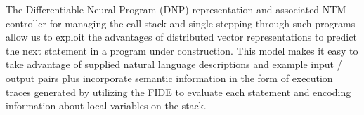 
The Differentiable Neural Program (DNP) representation and associated NTM controller for managing the call stack and single-stepping through such programs allow us to exploit the advantages of distributed vector representations to predict the next statement in a program under construction. This model makes it easy to take advantage of supplied natural language descriptions and example input / output pairs plus incorporate semantic information in the form of execution traces generated by utilizing the FIDE to evaluate each statement and encoding information about local variables on the stack.

